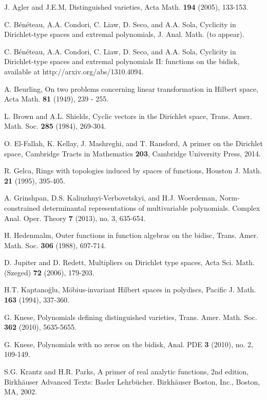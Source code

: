 \documentclass[11 pt,reqno]{amsart}
\theoremstyle{definition}
\theoremstyle{remark}
\numberwithin{equation}{section} \numberwithin{figure}{section}
\begin{document}
\begin{thebibliography}{1}
J. Agler and J.E.M\McCCarthy, Distinguished varieties, Acta Math. {\bf 194} (2005), 133-153.

C. B\'en\'eteau, A.A. Condori, C. Liaw, D. Seco, and
A.A. Sola, Cyclicity in Dirichlet-type spaces and extremal polynomials,
J. Anal. Math. (to appear).

C. B\'en\'eteau, A.A. Condori, C. Liaw, D. Seco, and
A.A. Sola, Cyclicity in Dirichlet-type spaces and extremal polynomials
II: functions on the bidisk, available at http://arxiv.org/abs/1310.4094.

 A. Beurling, On two problems concerning linear transformation in Hilbert
space, Acta Math. \textbf{81} (1949), 239 - 255.

L. Brown and A.L. Shields, Cyclic vectors in the Dirichlet space,
Trans. Amer. Math. Soc. {\bf 285} (1984), 269-304.

O. El-Fallah, K. Kellay, J. Mashreghi, and T. Ransford, A primer on the Dirichlet space,
Cambridge Tracts in Mathematics {\bf 203}, Cambridge University Press, 2014.

R. Gelca, Rings with topologies induced by spaces of
functions, Houston J. Math. {\bf 21} (1995), 395-405.

 A. Grinshpan, D.S. Kaliuzhnyi-Verbovetskyi, and
  H.J. Woerdeman, Norm-constrained determinantal representations of
  multivariable polynomials. Complex Anal. Oper. Theory \textbf{7} (2013),
  no. 3, 635-654.

H. Hedenmalm, Outer functions in function algebras on the
bidisc, Trans. Amer. Math. Soc. {\bf 306} (1988), 697-714.

D. Jupiter and D. Redett, Multipliers on Dirichlet type spaces,
Acta Sci. Math. (Szeged) {\bf 72} (2006), 179-203.

H.T. Kaptano\u{g}lu, M\"obius-invariant Hilbert spaces in polydiscs, Pacific J. Math. {\bf 163} (1994), 337-360.

G. Knese, Polynomials defining distinguished varieties, Trans. Amer. Math. Soc. {\bf 362} (2010), 5635-5655.

 G. Knese, Polynomials with no zeros on the bidisk,
  Anal. PDE {\bf 3} (2010), no. 2, 109-149.

 S.G. Krantz and H.R. Parks, A primer of real analytic
  functions, 2nd edition,  Birkh\"auser Advanced Texts: Basler
  Lehrb\"ucher. Birkh\"auser Boston, Inc., Boston, MA, 2002.


\end{thebibliography}
\end{document}
